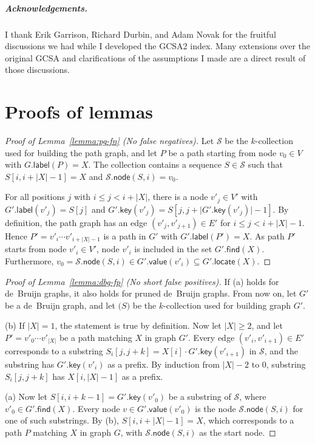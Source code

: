 \documentclass[a4paper,UKenglish]{lipics-v2016}
\newcommand{\abs}[1]{\ensuremath{\lvert #1 \rvert}}
\newcommand{\find}{\ensuremath{\mathsf{find}}}
\newcommand{\locate}{\ensuremath{\mathsf{locate}}}
\newcommand{\glabel}{\ensuremath{\mathsf{label}}}
\newcommand{\gkey}{\ensuremath{\mathsf{key}}}
\newcommand{\gvalue}{\ensuremath{\mathsf{value}}}
\newcommand{\gnode}{\ensuremath{\mathsf{node}}}
\newcommand{\kcollection}[1]{$#1$\nobreakdash-collection}
\begin{document}
\subparagraph*{Acknowledgements.}

I thank Erik Garrison, Richard Durbin, and Adam Novak for the fruitful discussions we had while I developed the GCSA2 index. Many extensions over the original GCSA and clarifications of the assumptions I made are a direct result of those discussions.




\clearpage
\appendix
\section{Proofs of lemmas}

\begin{proof}[Proof of Lemma~\ref{lemma:pg-fn} (No false negatives)]
Let $\mathcal{S}$ be the \kcollection{k} used for building the path graph, and let $P$ be a path starting from node $v_{0} \in V$ with $G.\glabel(P) = X$. The collection contains a sequence $S \in \mathcal{S}$ such that $S[i, i+\abs{X}-1] = X$ and $\mathcal{S}.\gnode(S, i) = v_{0}$.

For all positions $j$ with $i \le j < i+\abs{X}$, there is a node $v'_{j} \in V'$ with $G'.\glabel(v'_{j}) = S[j]$ and $G'.\gkey(v'_{j}) = S[j, j+\abs{G'.\gkey(v'_{j})}-1]$.
By definition, the path graph has an edge $(v'_{j}, v'_{j+1}) \in E'$ for $i \le j < i+\abs{X}-1$.
Hence $P' = v'_{i} \dotsm v'_{i+\abs{X}-1}$ is a path in $G'$ with $G'.\glabel(P') = X$.
As path $P'$ starts from node $v'_{i} \in V'$, node $v'_{i}$ is included in the set $G'.\find(X)$.
Furthermore, $v_{0} = \mathcal{S}.\gnode(S, i) \in G'.\gvalue(v'_{i}) \subseteq G'.\locate(X)$.
\end{proof}

\begin{proof}[Proof of Lemma~\ref{lemma:dbg-fp} (No short false positives)]
If (a) holds for de~Bruijn graphs, it also holds for pruned de~Bruijn graphs. From now on, let $G'$ be a de~Bruijn graph, and let $\mathcal(S)$ be the \kcollection{k} used for building graph $G'$.

(b) If $\abs{X} = 1$, the statement is true by definition. Now let $\abs{X} \ge 2$, and let $P' = v'_{0} \dotsm v'_{\abs{X}}$ be a path matching $X$ in graph $G'$. Every edge $(v'_{i}, v'_{i+1}) \in E'$ corresponds to a substring $S_{i}[j, j+k] = X[i] \cdot G'.\gkey(v'_{i+1})$ in $\mathcal{S}$, and the substring has $G'.\gkey(v'_{i})$ as a prefix. By induction from $\abs{X}-2$ to $0$, substring $S_{i}[j, j+k]$ has $X[i, \abs{X}-1]$ as a prefix.

(a) Now let $S[i, i+k-1] = G'.\gkey(v'_{0})$ be a substring of $\mathcal{S}$, where $v'_{0} \in G'.\find(X)$. Every node $v \in G'.\gvalue(v'_{0})$ is the node $\mathcal{S}.\gnode(S, i)$ for one of such substrings. By (b), $S[i, i+\abs{X}-1] = X$, which corresponds to a path $P$ matching $X$ in graph $G$, with $\mathcal{S}.\gnode(S, i)$ as the start node.
\end{proof}
\end{document}
